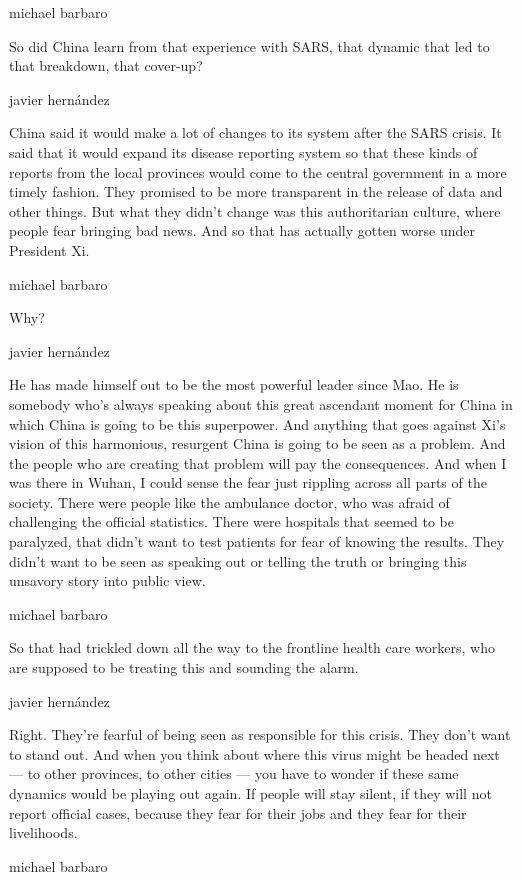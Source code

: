 michael barbaro

So did China learn from that experience with SARS, that dynamic that led
to that breakdown, that cover-up?

javier hernández

China said it would make a lot of changes to its system after the SARS
crisis. It said that it would expand its disease reporting system so
that these kinds of reports from the local provinces would come to the
central government in a more timely fashion. They promised to be more
transparent in the release of data and other things. But what they
didn't change was this authoritarian culture, where people fear bringing
bad news. And so that has actually gotten worse under President Xi.

michael barbaro

Why?

javier hernández

He has made himself out to be the most powerful leader since Mao. He is
somebody who's always speaking about this great ascendant moment for
China in which China is going to be this superpower. And anything that
goes against Xi's vision of this harmonious, resurgent China is going to
be seen as a problem. And the people who are creating that problem will
pay the consequences. And when I was there in Wuhan, I could sense the
fear just rippling across all parts of the society. There were people
like the ambulance doctor, who was afraid of challenging the official
statistics. There were hospitals that seemed to be paralyzed, that
didn't want to test patients for fear of knowing the results. They
didn't want to be seen as speaking out or telling the truth or bringing
this unsavory story into public view.

michael barbaro

So that had trickled down all the way to the frontline health care
workers, who are supposed to be treating this and sounding the alarm.

javier hernández

Right. They're fearful of being seen as responsible for this crisis.
They don't want to stand out. And when you think about where this virus
might be headed next --- to other provinces, to other cities --- you
have to wonder if these same dynamics would be playing out again. If
people will stay silent, if they will not report official cases, because
they fear for their jobs and they fear for their livelihoods.

michael barbaro

